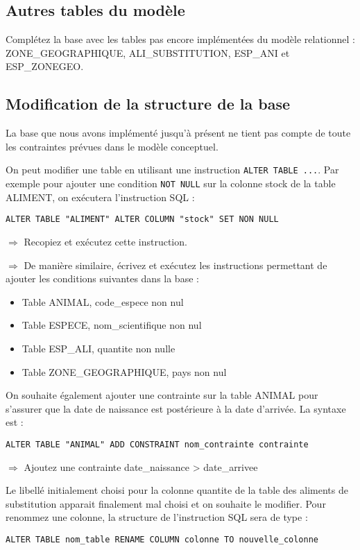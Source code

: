 \documentclass[11pt]{article}
\begin{document}
			
			\subsection{Autres tables du modèle}
				Complétez la base avec les tables pas encore implémentées du modèle relationnel : ZONE\_GEOGRAPHIQUE, ALI\_SUBSTITUTION, ESP\_ANI et ESP\_ZONEGEO.
						

			\subsection{Modification de la structure de la base}
				La base que nous avons implémenté jusqu'à présent ne tient pas compte de toute les contraintes prévues dans le modèle conceptuel.
				
				On peut modifier une table en utilisant une instruction \lstinline{ALTER TABLE ...}. Par exemple pour ajouter une condition \lstinline{NOT NULL} sur la colonne stock de la table ALIMENT, on exécutera l'instruction SQL :
				\begin{lstlisting}
ALTER TABLE "ALIMENT" ALTER COLUMN "stock" SET NON NULL
				\end{lstlisting}
				
				$\Rightarrow$ Recopiez et exécutez cette instruction.
				
				$\Rightarrow$ De manière similaire, écrivez et exécutez les instructions permettant de ajouter les conditions suivantes dans la base :
				\begin{itemize}
					\item Table ANIMAL, code\_espece non nul
					\item Table ESPECE, nom\_scientifique non nul
					\item Table ESP\_ALI, quantite non nulle
					\item Table ZONE\_GEOGRAPHIQUE, pays non nul
				\end{itemize}
				
				On souhaite également ajouter une contrainte sur la table ANIMAL pour s'assurer que la date de naissance est postérieure à la date d'arrivée. La syntaxe est :
				\begin{lstlisting}
ALTER TABLE "ANIMAL" ADD CONSTRAINT nom_contrainte contrainte
				\end{lstlisting}
				
				$\Rightarrow$ Ajoutez une contrainte date\_naissance > date\_arrivee
				
				Le libellé initialement choisi pour la colonne quantite de la table des aliments de substitution apparait finalement mal choisi et on souhaite le modifier. Pour renommez une colonne, la structure de l'instruction SQL sera de type :
				\begin{lstlisting}
ALTER TABLE nom_table RENAME COLUMN colonne TO nouvelle_colonne
				\end{lstlisting}
				
\end{document}
